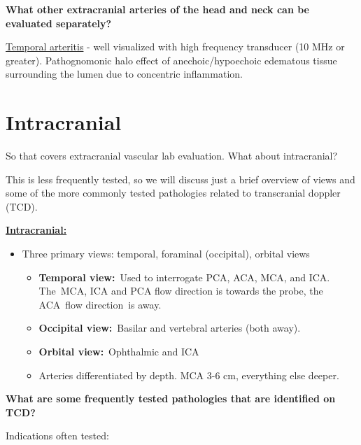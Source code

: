 \documentclass[
]{book}
\begin{document}
\textbf{What other extracranial arteries of the head and neck can be evaluated
separately?}

\uline{Temporal arteritis} - well visualized with high frequency
transducer (10 MHz or greater). Pathognomonic halo effect of
anechoic/hypoechoic edematous tissue surrounding the lumen due to
concentric inflammation.\citep{ball2010, schmidt2014}

\hypertarget{intracranial}{%
\section{Intracranial}\label{intracranial}}

So that covers extracranial vascular lab evaluation. What about
intracranial?

This is less frequently tested, so we will discuss just a brief overview
of views and some of the more commonly tested pathologies related to
transcranial doppler (TCD).

\uline{\textbf{Intracranial:}}

\begin{itemize}
\item
  Three primary views: temporal, foraminal (occipital), orbital views

  \begin{itemize}
  \item
    \textbf{Temporal view:}~Used to interrogate PCA, ACA, MCA, and ICA.
    The~MCA, ICA and PCA flow direction is towards the probe, the
    ACA~flow direction~is away.
  \item
    \textbf{Occipital view:}~Basilar and vertebral arteries (both away).
  \item
    \textbf{Orbital view:}~Ophthalmic and ICA
  \item
    Arteries differentiated by depth. MCA 3-6 cm, everything else
    deeper.
  \end{itemize}
\end{itemize}

\textbf{What are some frequently tested pathologies that are identified on
TCD?}

Indications often tested:
\end{document}
